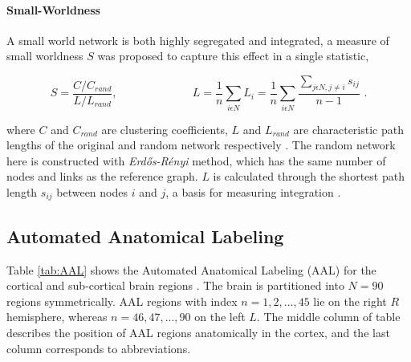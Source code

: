 \documentclass[fleqn,10pt]{wlpeerj}
\begin{document}
\paragraph{Small-Worldness}

A small world network is both highly segregated and integrated, a measure of small worldness $S$ was proposed to capture this effect in a single statistic,

\begin{equation}
S = \frac{C/C_{rand}}{L/L_{rand}}, \,\,\,\,\,\,\,\,\,\,\,\,\,\,\,\,\,\,\,\,\,\,\,\,\,\,\,\,\,\,\,\,\,\,\,\,\,\,\,\, L = \frac{1}{n}\sum\limits_{i \epsilon N} L_i = \frac{1}{n}\sum\limits_{i \epsilon N} \frac{\sum\limits_{j \epsilon N, j \neq i }s_{ij}}{n-1 } \,\, .
\end{equation}
 
where $C$ and $C_{rand}$ are clustering coefficients, $L$ and $L_{rand}$ are characteristic path lengths of the original and random network respectively \citep{HUM08}. The random network here is constructed with \textit{Erd\H{o}s-R\'{e}nyi} method, which has the same number of nodes and links as the reference graph. $L$ is calculated through the shortest path length $s_{ij}$ between nodes $i$ and $j$, a basis for measuring integration \citep{RUB10}. 


\subsection*{Automated Anatomical Labeling}

Table \ref{tab:AAL} shows the Automated Anatomical Labeling (AAL) for the cortical and sub-cortical brain regions \citep{TZO02}. The brain is partitioned into $N=90$ regions symmetrically. AAL regions with index $n={1,2,...,45}$ lie on the right $R$ hemisphere, whereas $n={46,47,...,90}$ on the left $L$. The middle column of table describes the position of AAL regions anatomically in the cortex, and the last column corresponds to abbreviations.
\end{document}
